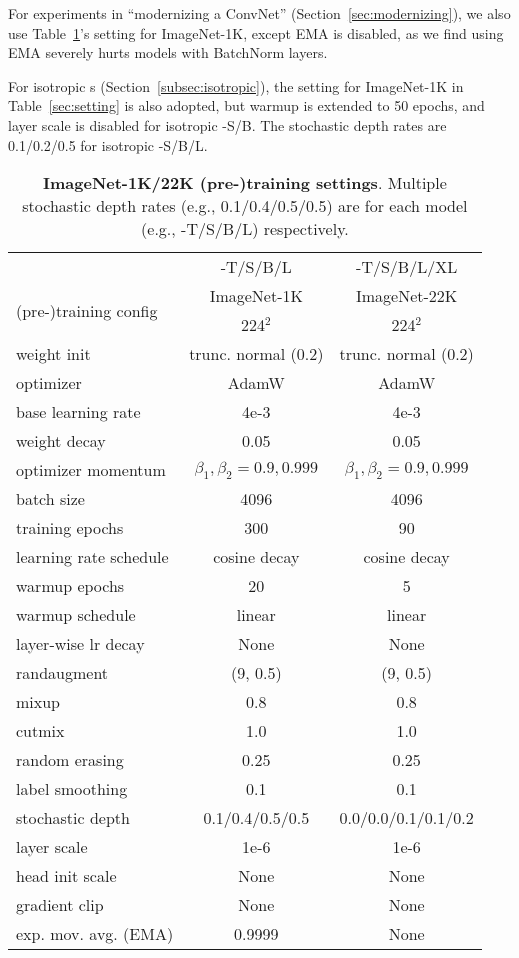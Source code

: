For experiments in ``modernizing a ConvNet'' (Section~\ref{sec:modernizing}), we also use Table~\ref{tab:train_detail}'s setting for ImageNet-1K, except EMA is disabled, as we find using EMA severely hurts models with BatchNorm layers.

For isotropic \cnn{}s (Section~\ref{subsec:isotropic}), the setting for ImageNet-1K in Table~\ref{sec:setting} is also adopted, but warmup is extended to 50 epochs, and layer scale is disabled for isotropic \cnn{}-S/B. The stochastic depth rates are 0.1/0.2/0.5 for isotropic \cnn{}-S/B/L.

\begin{table}[!htbp]
\small
\begin{tabular}{@{\hskip -0.05ex}l|c@{\hskip 1ex}c}
& \cnn{}-T/S/B/L & \cnn{}-T/S/B/L/XL \\
\multirow{2}{*}{(pre-)training config} & ImageNet-1K & ImageNet-22K \\
& 224$^2$ & 224$^2$ \\
\shline
weight init & trunc. normal (0.2) & trunc. normal (0.2) \\
optimizer & AdamW & AdamW\\
base learning rate & 4e-3 & 4e-3 \\
weight decay & 0.05 & 0.05 \\
optimizer momentum & $\beta_1, \beta_2{=}0.9, 0.999$ & $\beta_1, \beta_2{=}0.9, 0.999$ \\
batch size & 4096 & 4096 \\
training epochs & 300 & 90 \\
learning rate schedule & cosine decay & cosine decay \\
warmup epochs & 20 & 5 \\
warmup schedule & linear & linear \\
layer-wise lr decay \cite{Clark2020,Bao2021} & None & None \\
randaugment \cite{Cubuk2020} & (9, 0.5) & (9, 0.5) \\
mixup \cite{Zhang2018a} & 0.8 & 0.8 \\
cutmix \cite{Yun2019} & 1.0 & 1.0 \\
random erasing \cite{Zhong2020} & 0.25 & 0.25 \\
label smoothing \cite{Szegedy2016a} & 0.1 & 0.1 \\
stochastic depth \cite{Huang2016deep} & 0.1/0.4/0.5/0.5 & 0.0/0.0/0.1/0.1/0.2 \\
layer scale \cite{Touvron2021GoingDW} & 1e-6 & 1e-6 \\
head init scale \cite{Touvron2021GoingDW} & None & None \\
gradient clip & None & None \\
exp. mov. avg. (EMA) \cite{Polyak1992} & 0.9999 & None\\

\end{tabular}
\caption{\textbf{ImageNet-1K/22K (pre-)training settings}. Multiple stochastic depth rates (e.g., 0.1/0.4/0.5/0.5) are for each model (e.g., \cnn{}-T/S/B/L) respectively.}
\label{tab:train_detail}
\end{table}

